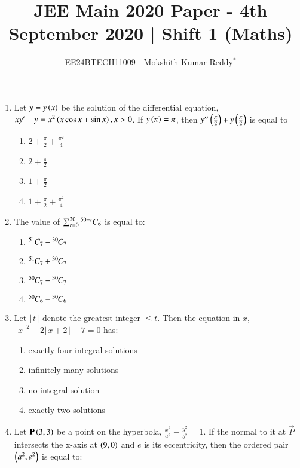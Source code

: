 \documentclass[journal,12pt,onecolumn,draftclsnofoot]{IEEEtran}
\theoremstyle{remark}
\begin{document}

\vspace{3cm}

\title{JEE Main 2020 Paper - 4th September 2020 | Shift 1 (Maths)}
\author{EE24BTECH11009 - Mokshith Kumar Reddy$^{*}$%
}
\maketitle
\bigskip
\begin{enumerate}

\item Let $y=y\left(x\right)$ be the solution of the differential equation, $xy^\prime-y=x^2\left(x\cos x+\sin x\right),x>0$. If $y\left(\pi\right)=\pi$, then $y'^\prime\left(\frac{\pi}{2}\right)+y\left(\frac{\pi}{2}\right)$ is equal to
    \begin{enumerate}
    \item $2+\frac{\pi}{2}+\frac{\pi^2}{4}$
    \item $2+\frac{\pi}{2}$
    \item $1+\frac{\pi}{2}$
    \item $1+\frac{\pi}{2}+\frac{\pi^2}{4}$
\end{enumerate}    
    \item The value of $\sum_{r=0}^{20}{{}^{50-r}\mkern-1muC_{6}}$ is equal to:
    \begin{enumerate}
        \item ${{}^{51}\mkern-1muC_{7}}-{{}^{30}\mkern-1muC_{7}}$
        \item ${{}^{51}\mkern-1muC_{7}}+{{}^{30}\mkern-1muC_{7}}$
        \item ${{}^{50}\mkern-1muC_{7}}-{{}^{30}\mkern-1muC_{7}}$
        \item ${{}^{50}\mkern-1muC_{6}}-{{}^{30}\mkern-1muC_{6}}$
    \end{enumerate}
\item Let $\lfloor t\rfloor$ denote the greatest integer $\leq t$. Then the equation in $x$,$\lfloor x\rfloor^2+2\lfloor x+2\rfloor-7=0$ has:
\begin{enumerate}
    \item exactly four integral solutions
    \item infinitely many solutions
    \item no integral solution
    \item exactly two solutions
    \end{enumerate}
\item Let $\mathbf{P}\left(3,3\right)$ be a point on the hyperbola, $\frac{x^2}{a^2}-\frac{y^2}{b^2}=1$. If the normal to it at $\vec{P}$ intersects the x-axis at $\left(9,0\right)$ and $e$ is its eccentricity, then the ordered pair $\left(a^2, e^2\right)$ is equal to:

\end{enumerate}
\end{document}
